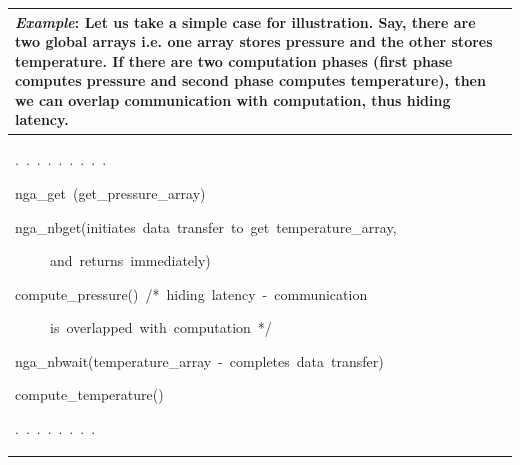 \begin{tabular}{|>{\raggedright}p{13cm}|}
\hline 
\emph{Example}: Let us take a simple case for illustration. Say, there
are two global arrays i.e. one array stores pressure and the other
stores temperature. If there are two computation phases (first phase
computes pressure and second phase computes temperature), then we
can overlap communication with computation, thus hiding latency.\tabularnewline
\hline 
\begin{lyxcode}
.~.~.~.~.~.~.~.~.~

nga\_get~(get\_pressure\_array)

nga\_nbget(initiates~data~transfer~to~get~temperature\_array,~

~~~~~and~returns~immediately)

compute\_pressure()~/{*}~hiding~latency~-~communication~

~~~~~is~overlapped~with~computation~{*}/

nga\_nbwait(temperature\_array~-~completes~data~transfer)

compute\_temperature()~

.~.~.~.~.~.~.~.
\end{lyxcode}
\tabularnewline
\hline
\end{tabular}

